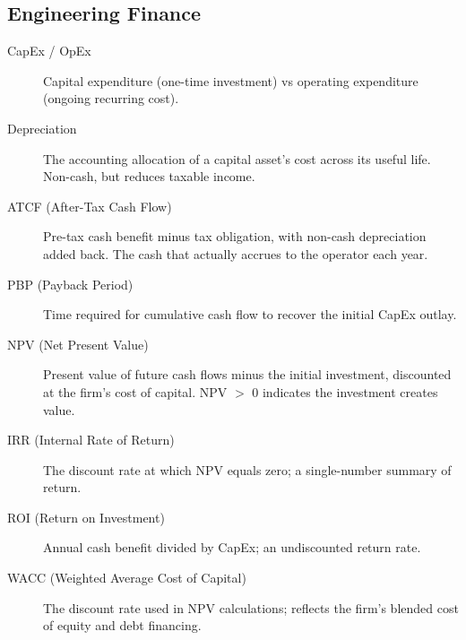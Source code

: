 \documentclass[conference]{IEEEtran}
\begin{document}
\subsection*{Engineering Finance}
\begin{description}
  \item[CapEx / OpEx] Capital expenditure (one-time investment) vs operating expenditure (ongoing recurring cost).
  \item[Depreciation] The accounting allocation of a capital asset's cost across its useful life. Non-cash, but reduces taxable income.
  \item[ATCF (After-Tax Cash Flow)] Pre-tax cash benefit minus tax obligation, with non-cash depreciation added back. The cash that actually accrues to the operator each year.
  \item[PBP (Payback Period)] Time required for cumulative cash flow to recover the initial CapEx outlay.
  \item[NPV (Net Present Value)] Present value of future cash flows minus the initial investment, discounted at the firm's cost of capital. NPV $>$ 0 indicates the investment creates value.
  \item[IRR (Internal Rate of Return)] The discount rate at which NPV equals zero; a single-number summary of return.
  \item[ROI (Return on Investment)] Annual cash benefit divided by CapEx; an undiscounted return rate.
  \item[WACC (Weighted Average Cost of Capital)] The discount rate used in NPV calculations; reflects the firm's blended cost of equity and debt financing.
\end{description}
\end{document}
